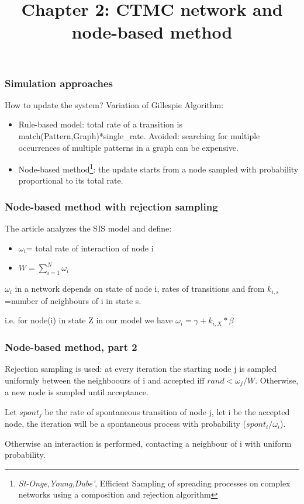 \documentclass{beamer}
\begin{document}
\begin{frame}
\title{Chapter 2: CTMC network and node-based method}
\subtitle{}
\date{}
\titlepage
\end{frame}

	\begin{frame}
\frametitle{Simulation approaches}

How to update the system? Variation of Gillespie Algorithm:

\begin{itemize}
	\item Rule-based model: total rate of a transition is match(Pattern,Graph)*single\_rate. Avoided: searching for multiple occurrences of multiple patterns in a graph can be expensive.
	\item Node-based method\footnote{\textit{St-Onge,Young,Dube'}, Efficient Sampling of spreading processes on complex networks using a composition and rejection algorithm}: the update starts from a node sampled with probability proportional to its total rate. 
\end{itemize}
\end{frame}


	\begin{frame}
	\frametitle{Node-based method with rejection sampling}
	The article analyzes the SIS model and define:
	
		\begin{itemize}
			\item $\omega_i$= total rate of interaction of node i
			\item $W=\sum_{i=1}^N \omega_i$
		\end{itemize}
	\vspace{5 pt}
	$\omega_i$ in a network depends on state of node i, rates of transitions and from $k_{i,s}$=number of neighbours of i in state s.
	
	i.e. for node(i) in state Z in our model we have $\omega_i= \gamma+k_{i,X}*\beta$ 			
	\end{frame}
	
	
	\begin{frame}
	\frametitle{Node-based method, part 2}
	 Rejection sampling is used: at every iteration the starting node j is sampled uniformly between the neighboours of i and accepted iff $rand<\omega_j/W$. Otherwise, a new node is sampled until acceptance.
	
	Let $spont_j$ be the rate of spontaneous transition of node j, let i be the accepted node, the iteration will be a spontaneous process with probability ($spont_i/\omega_i$). 
	
	Otherwise an interaction is performed, contacting a neighbour of i with uniform probability.
	\end{frame}
 	
\end{document}

